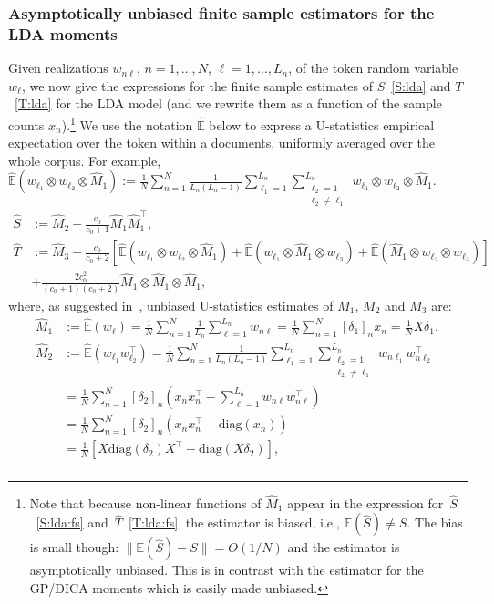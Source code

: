 \documentclass{article}
\newcommand{\normp}[1]{\|#1\|}
\newcommand{\rbra}[1]{\left(#1\right)}
\newcommand{\sbra}[1]{\left[#1\right]}
\newcommand{\wh}[1]{\widehat{#1}}
\newcommand{\diag}{\mathrm{diag}}
\newcommand{\tp}{\otimes}
\newcommand{\sumn}{\sum_{n=1}^N}
\newcommand{\ebb}{\mathbb{E}}
\begin{document}
\subsubsection{Asymptotically unbiased finite sample estimators for the LDA moments} \label{sec:lda:fs}
Given realizations $w_{n\ell}$, $n=1,\dots,N$, $\ell=1,\dots,L_n$, of the token random variable $w_{\ell}$, we now give the expressions for the finite sample estimates of $S$~\eqref{S:lda} and $T$~\eqref{T:lda} for the LDA model (and we rewrite them as a function of the sample counts $x_n$).\footnote{Note that because non-linear functions of $\wh{M}_1$ appear in the expression for~$\wh{S}$~\eqref{S:lda:fs} and~$\wh{T}$~\eqref{T:lda:fs}, the estimator is biased, i.e., $\ebb(\wh{S}) \neq S$. The bias is small though: $\normp{\ebb(\wh{S}) -  S} = O(1/N)$ and the estimator is asymptotically unbiased. This is in contrast with the estimator for the GP/DICA moments which is easily made unbiased.} We use the notation $\wh{\ebb}$ below to express a U-statistics empirical expectation over the token within a documents, uniformly averaged over the whole corpus. For example, $\wh{\ebb}(w_{\ell_1}\tp w_{\ell_2} \tp \wh{M}_1) := \frac{1}{N} \sumn \frac{1}{L_n(L_n-1)}\sum_{\ell_1=1}^{L_n} \sum_{\substack{\ell_2=1\\ \ell_2\ne \ell_1}}^{L_n} w_{\ell_1}\tp w_{\ell_2}\tp \wh{M}_1 $.
\begin{align}
\label{S:lda:fs}
\wh{S} &:= \wh{M}_2 - \frac{c_0}{c_0+1} \wh{M}_1  \wh{M}_1^{\top}, \\
\nonumber
\wh{T} & := \wh{M}_3 - \frac{c_0}{c_0+2} \sbra{\wh{\ebb}(w_{\ell_1}\tp w_{\ell_2} \tp \wh{M}_1) + \wh{\ebb}(w_{\ell_1} \tp \wh{M}_1 \tp w_{\ell_3}) + \wh{\ebb}(\wh{M}_1\tp w_{\ell_2} \tp w_{\ell_3})} \\
\label{T:lda:fs}
& + \frac{2c_0^2}{(c_0+1)(c_0+2)} \wh{M}_1\tp \wh{M}_1 \tp \wh{M}_1,
\end{align}
where, as suggested in~\cite{AnaEtAl2014}, unbiased U-statistics estimates of 
$M_1$, $M_2$ and $M_3$ are:
\begin{align}
\label{m1final} \wh{M}_1 & :=\wh{\ebb}(w_{\ell})= \frac{1}{N} \sumn \frac{1}{L_n} \sum_{\ell=1}^{L_n} w_{n\ell} = \frac{1}{N}\sumn [\delta_1]_n x_n  = \frac{1}{N} X\delta_1, \\
\nonumber \wh{M}_2 &:=\wh{\ebb}(w_{\ell_1} w_{\ell_2}^{\top}) = \frac{1}{N} \sumn \frac{1}{L_n(L_n-1)}\sum_{\ell_1=1}^{L_n} \sum_{\substack{\ell_2=1\\ \ell_2\ne \ell_1}}^{L_n}w_{n\ell_1} w_{n\ell_2}^{\top} \\
\nonumber & = \frac{1}{N} \sumn [\delta_2]_n \rbra{x_n x_n^{\top} - \sum_{\ell=1}^{L_n} w_{n\ell} w_{n\ell}^{\top}} \\
\nonumber & = \frac{1}{N} \sumn [\delta_2]_n \rbra{x_n x_n^{\top} - \diag(x_n) } \\ 
\label{m2final} &= \frac{1}{N} \sbra{X \diag(\delta_2)X^{\top} - \diag(X\delta_2)}, \\ \end{align}
\end{document}
